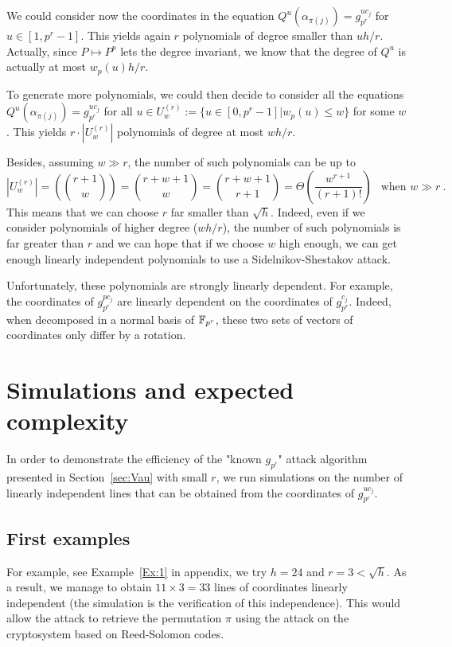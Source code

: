 \documentclass[a4paper]{article}
\begin{document}
We could consider now the coordinates in the equation $Q^u(\alpha_{\pi(j)}) = g_{p^r}^{u c_j}$ for $u \in [1,p^r-1]$. This yields again $r$ polynomials of degree smaller than $u h/r$. Actually, since $P \mapsto P^p$ lets the degree invariant, we know that the degree of $Q^u$ is actually at most $w_p(u) h / r$.

To generate more polynomials, we could then decide to consider all the equations $Q^u(\alpha_{\pi(j)}) = g_{p^r}^{u c_j}$ for all $u \in U_w^{(r)} := \{ u \in [0,p^r-1] | w_p(u) \leq w \}$ for some $w$. This yields $r \cdot |U_w^{(r)}|$ polynomials of degree at most $wh/r$.

Besides, assuming $w \gg r$, the number of such polynomials can be up to
$$ | U_w^{(r)} | = \left( \binom{r+1}{w} \right) = \binom{r+w+1}{w} = \binom{r+w+1}{r+1} = \Theta\left(\frac{w^{r+1}}{(r+1)!}\right) \ \ \text{ when } w \gg r \ .$$
This means that we can choose $r$ far smaller than $\sqrt{h}$. Indeed, even if we consider polynomials of higher degree ($wh/r$), the number of such polynomials is far greater than $r$ and we can hope that if we choose $w$ high enough, we can get enough linearly independent polynomials to use a Sidelnikov-Shestakov attack.


Unfortunately, these polynomials are strongly linearly dependent.
For example, the coordinates of $g_{p^r}^{p c_j}$ are linearly dependent on the coordinates of $g_{p^r}^{c_j}$. Indeed, when decomposed in a normal basis of $\mathbb{F}_{p^r}$, these two sets of vectors of coordinates only differ by a rotation.


\newpage
\section{Simulations and expected complexity}
\label{sec:Simul}


In order to demonstrate the efficiency of the "known $g_{p^r}$" attack algorithm presented in Section~\ref{sec:Vau} with small $r$, we run simulations on the number of linearly independent lines that can be obtained from the coordinates of $g_{p^r}^{uc_j}$.


\subsection{First examples}

For example, see Example~\ref{Ex:1} in appendix, we try $h = 24$ and $r = 3 < \sqrt{h}$. As a result, we manage to obtain $11 \times 3 = 33$ lines of coordinates linearly independent (the simulation is the verification of this independence). This would allow the attack to retrieve the permutation $\pi$ using the attack on the cryptosystem based on Reed-Solomon codes.
\end{document}
